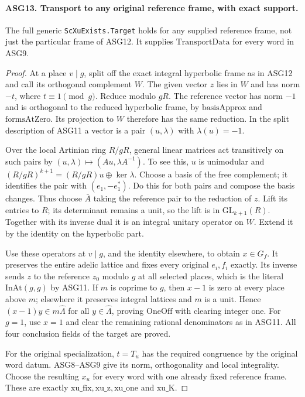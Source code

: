 \documentclass[11pt,a4paper]{article}
\numberwithin{equation}{section}
\theoremstyle{remark}\newtheorem{remark}[theorem]{Remark}
\begin{document}
\paragraph{ASG13. Transport to any original reference frame, with exact support.}
\label{claim:ASG13}
The full generic \texttt{Sc\allowbreak Xu\allowbreak Exists.\allowbreak Target} holds for any supplied
reference frame, not just the particular frame of ASG12.
It supplies \(\mathrm{TransportData}\) for every word in ASG9.
\begin{proof}
At a place \(v\mid g\), split off the exact integral hyperbolic
frame as in ASG12 and call its orthogonal complement \(W\).
The given vector \(z\) lies in \(W\) and has norm \(-t\),
where \(t\equiv1\pmod g\).  Reduce modulo \(gR\).
The reference vector has norm \(-1\) and is orthogonal to the
reduced hyperbolic frame, by \(\mathrm{basisApprox}\) and
\(\mathrm{formsAtZero}\).  Its projection to \(W\) therefore
has the same reduction.  In the split description of ASG11 a vector
is a pair \((u,\lambda)\) with \(\lambda(u)=-1\).

Over the local Artinian ring \(R/gR\), general linear matrices act
transitively on such pairs by
\((u,\lambda)\mapsto(Au,\lambda A^{-1})\).
To see this, \(u\) is unimodular and
\((R/gR)^{k+1}=(R/gR)u\oplus\ker\lambda\).
Choose a basis of the free complement; it identifies the pair with
\((e_1,-e_1^*)\).  Do this for both pairs and compose the basis
changes.  Thus choose \(\bar A\) taking the reference pair to
the reduction of \(z\).  Lift its entries to \(R\); its
determinant remains a unit, so the lift is in \(\mathrm{GL}_{k+1}(R)\).
Together with its inverse dual it is an integral unitary operator
on \(W\).  Extend it by the identity on the hyperbolic part.

Use these operators at \(v\mid g\), and the identity elsewhere,
to obtain \(x\in G_f\).  It preserves the entire adelic lattice
and fixes every original \(e_i,f_i\) exactly.  Its inverse sends
\(z\) to the reference \(z_0\) modulo \(g\) at all selected
places, which is the literal \(\mathrm{InAt}(g,g)\) by ASG11.
If \(m\) is coprime to \(g\), then \(x-1\) is zero at
every place above \(m\); elsewhere it preserves integral lattices
and \(m\) is a unit.  Hence \((x-1)y\in m\widehat\Lambda\)
for all \(y\in\widehat\Lambda\), proving \(\mathrm{OneOff}\)
with clearing integer one.  For \(g=1\), use \(x=1\) and
clear the remaining rational denominators as in ASG11.
All four conclusion fields of the target are proved.

For the original specialization, \(t=T_u\) has the required
congruence by the original word datum.  ASG8--ASG9 give its norm,
orthogonality and local integrality.  Choose the resulting \(x_u\)
for every word with one already fixed reference frame.  These are
exactly \(\mathrm{xu\_\allowbreak fix},\mathrm{xu\_\allowbreak z},\mathrm{xu\_\allowbreak one}\)
and \(\mathrm{xu\_\allowbreak K}\).
\end{proof}
\end{document}
